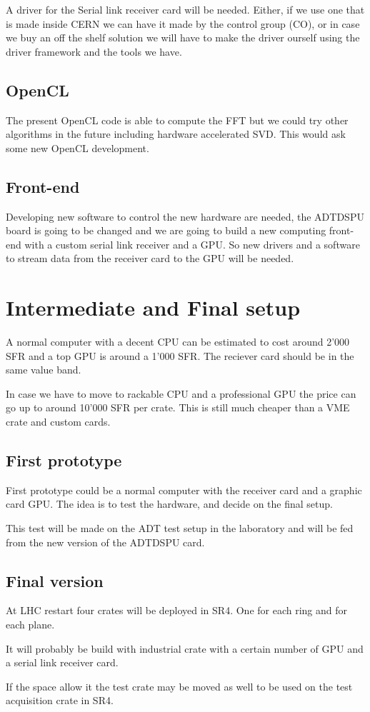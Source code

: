 A driver for the Serial link receiver card will be needed. Either, if we use one that is made inside \gls{CERN} we can have it made by the control group (CO), or in case we buy an off the shelf solution we will have to make the driver ourself using the driver framework and the tools we have.

\subsection{OpenCL}

The present \gls{OpenCL} code is able to compute the \gls{FFT} but we could try other algorithms in the future including hardware accelerated \gls{SVD}. This would ask some new \gls{OpenCL} development.

\subsection{Front-end}

Developing new software to control the new hardware are needed, the \gls{ADTDSPU} board is going to be changed and we are going to build a new computing front-end with a custom serial link receiver and a \gls{GPU}. So new drivers and a software to stream data from the receiver card to the \gls{GPU} will be needed.

\section{Intermediate and Final setup}

A normal computer with a decent \gls{CPU} can be estimated to cost around 2'000 SFR and a top \gls{GPU} is around a 1'000 SFR. The reciever card should be in the same value band.

In case we have to move to rackable \gls{CPU} and a professional \gls{GPU} the price can go up to around 10'000 SFR per crate. This is still much cheaper than a \gls{VME} crate and custom cards.

\subsection{First prototype}

First prototype could be a normal computer with the receiver card and a graphic card \gls{GPU}. The idea is to test the hardware, and decide on the final setup.

This test will be made on the \gls{ADT} test setup in the laboratory and will be fed from the new version of the \gls{ADTDSPU} card.

\subsection{Final version}

At \gls{LHC} restart four crates will be deployed in \gls{SR4}. One for each ring and for each plane.

It will probably be build with industrial crate with a certain number of \gls{GPU} and a serial link receiver card. 

If the space allow it the test crate may be moved as well to be used on the test acquisition crate in \gls{SR4}.